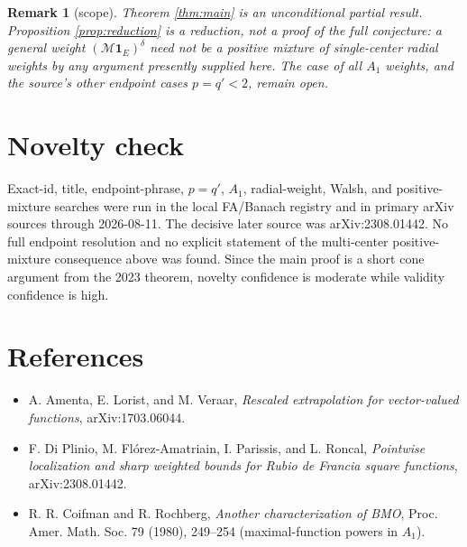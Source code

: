 \documentclass[11pt]{article}
\newtheorem{remark}{Remark}
\newcommand{\one}{\mathbf 1}
\newcommand{\M}{\mathcal M}
\begin{document}
\begin{remark}[scope]
Theorem \ref{thm:main} is an unconditional partial result.  Proposition
\ref{prop:reduction} is a reduction, not a proof of the full conjecture: a
general weight \((\M\one_E)^\delta\) need not be a positive mixture of
single-center radial weights by any argument presently supplied here.  The
case of all \(A_1\) weights, and the source's other endpoint cases
\(p=q'<2\), remain open.
\end{remark}

\section*{Novelty check}

Exact-id, title, endpoint-phrase, \(p=q'\), \(A_1\), radial-weight, Walsh,
and positive-mixture searches were run in the local FA/Banach registry and
in primary arXiv sources through 2026-08-11.  The decisive later source was
arXiv:2308.01442.  No full endpoint resolution and no explicit statement of
the multi-center positive-mixture consequence above was found.  Since the
main proof is a short cone argument from the 2023 theorem, novelty confidence
is moderate while validity confidence is high.

\section*{References}

\begin{itemize}
\item A. Amenta, E. Lorist, and M. Veraar,
\emph{Rescaled extrapolation for vector-valued functions},
arXiv:1703.06044.
\item F. Di Plinio, M. Fl\'orez-Amatriain, I. Parissis, and L. Roncal,
\emph{Pointwise localization and sharp weighted bounds for Rubio de Francia
square functions}, arXiv:2308.01442.
\item R. R. Coifman and R. Rochberg,
\emph{Another characterization of BMO}, Proc. Amer. Math. Soc. 79 (1980),
249--254 (maximal-function powers in \(A_1\)).
\end{itemize}
\end{document}

